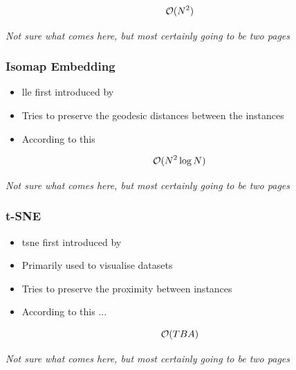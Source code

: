 $$\mathcal{O}(N^2)$$

\clearpage

\begin{center}
	\textit{Not sure what comes here, but most certainly going to be two pages}
\end{center}

\clearpage




\subsubsection{Isomap Embedding}

\begin{itemize}
	\item \Gls{lle} first introduced by \cite{tenenbaum2000global}
	\item Tries to preserve the geodesic distances between the instances \cite{HandsOnMLCh8}
	\item According to this \cite{DRUnsupervisedNearestNeighbors}
\end{itemize}

$$\mathcal{O}(N^2 \log N)$$

\clearpage

\begin{center}
	\textit{Not sure what comes here, but most certainly going to be two pages}
\end{center}

\clearpage



\subsubsection{t-SNE}

\begin{itemize}
	\item \gls{tsne} first introduced by \cite{van2008visualizing}
	\item Primarily used to visualise datasets
	\item Tries to preserve the proximity between instances \cite{HandsOnMLCh8}
	\item According to this ...
\end{itemize}

$$\mathcal{O}(TBA)$$

\clearpage

\begin{center}
	\textit{Not sure what comes here, but most certainly going to be two pages}
\end{center}

\clearpage
